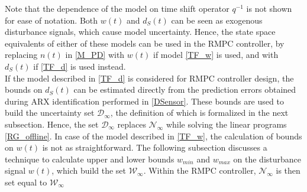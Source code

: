 \documentclass[letterpaper, 10 pt, conference]{ieeeconf}  %
\begin{document}
	Note that the dependence of the model on time shift operator $q^{-1}$ is not shown for ease of notation. Both $w(t)$ and $d_S(t)$ can be seen as exogenous disturbance signals, which cause model uncertainty. Hence, the state space equivalents of either of these models can be used in the RMPC controller, by replacing $n(t)$ in \eqref{M_PD} with $w(t)$ if model \eqref{TF_w} is used, and with $d_S(t)$ if \eqref{TF_d} is used instead. \\
	If the model described in \eqref{TF_d} is considered for RMPC controller design, the bounds on $d_S(t)$ can be estimated directly from the prediction errors obtained during ARX identification performed in \eqref{DSensor}. These bounds are used to build the uncertainty set $\mathcal{D}_{\infty}$, the definition of which is formalized in the next subsection. Hence, the set $\mathcal{D}_{\infty}$ replaces $\mathcal{N}_{\infty}$ while solving the linear programs \eqref{RG_offline}.	In case of the model described in \eqref{TF_w}, the calculation of bounds on $w(t)$ is not as straightforward. 
	The following subsection discusses a technique to calculate upper and lower bounds $w_{min}$ and $w_{max}$ on the disturbance signal $w(t)$, which build the set $\mathcal{W}_{\infty}$. Within the RMPC controller, $\mathcal{N}_{\infty}$ is then set equal to $\mathcal{W}_{\infty}$
\end{document}
